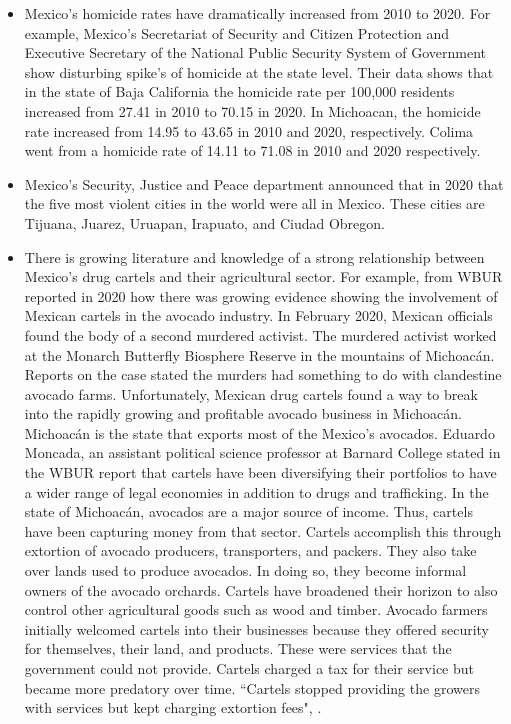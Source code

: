 \documentclass[12pt]{article}
\begin{document}
\begin{itemize}
  \item Mexico's homicide rates have dramatically increased from 2010 to 2020. For example, Mexico's Secretariat of Security and Citizen Protection and Executive Secretary of the National Public Security System of Government show disturbing spike's of homicide at the state level. Their data shows that in the state of Baja California the homicide rate per 100,000 residents increased from 27.41 in 2010 to 70.15 in 2020. In Michoacan, the homicide rate increased from 14.95 to 43.65 in 2010 and 2020, respectively.  Colima went from a homicide rate of 14.11 to 71.08 in 2010 and 2020 respectively.  
  \item Mexico's Security, Justice and Peace department announced that in 2020 that the five most violent cities in the world were all in Mexico. These cities are Tijuana, Juarez, Uruapan, Irapuato, and Ciudad Obregon.
  \item There is growing literature and knowledge of a strong relationship between Mexico's drug cartels and their agricultural sector. For example, \cite{O'Dowd} from WBUR reported in 2020 how there was growing evidence showing the involvement of Mexican cartels in the avocado industry. In February 2020, Mexican officials found the body of a second murdered activist. The murdered activist worked at the Monarch Butterfly Biosphere Reserve in the mountains of Michoacán. Reports on the case stated the murders had something to do with clandestine avocado farms. Unfortunately, Mexican drug cartels found a way to break into the rapidly growing and profitable avocado business in Michoacán. Michoacán is the state that exports most of the Mexico's avocados. Eduardo Moncada, an assistant political science professor at Barnard College stated in the WBUR report that cartels have been diversifying their portfolios to have a wider range of legal economies in addition to drugs and trafficking. In the state of Michoacán, avocados are a major source of income. Thus, cartels have been capturing money from that sector. Cartels accomplish this through extortion of avocado producers, transporters, and packers. They also take over lands used to produce avocados. In doing so, they become informal owners of the avocado orchards. Cartels have broadened their horizon to also control other agricultural goods such as wood and timber. Avocado farmers initially welcomed cartels into their businesses because they offered security for themselves, their land, and products. These were services that the government could not provide. Cartels charged a tax for their service but became more predatory over time. ``Cartels stopped providing the growers with services but kept charging extortion fees", \cite{O'Dowd}.

\end{itemize}
\end{document}
